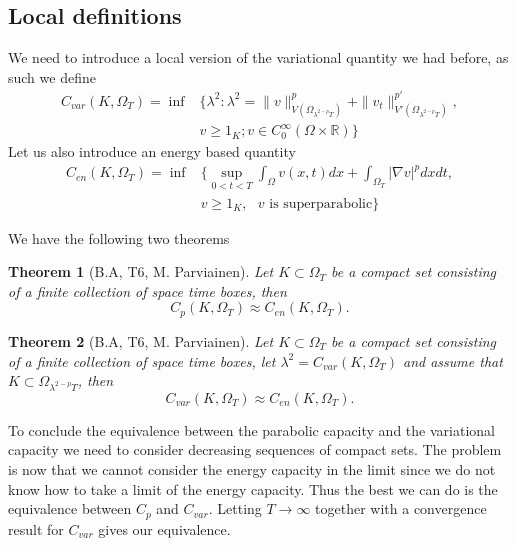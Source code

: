 \documentclass[reqno,a4paper,12pt]{amsart}
\newtheorem{theorem}{Theorem}[section]
\theoremstyle{definition}
\numberwithin{theorem}{section} \numberwithin{equation}{section}
\newcommand{\R}{{\mathbb R}}
\begin{document}
\subsection{Local definitions}
We need to introduce a local version of the variational quantity we had before, as such we define
\begin{align*} \nonumber \label{}
	C_{var}(K,\Omega_T) = \inf &\{\lambda^2: \lambda^2 = \|v\|^{p}_{V(\Omega_{\lambda^{2-p}T})} + \|v_t\|^{p'}_{V'(\Omega_{\lambda^{2-p}T})}, \\
	&v \geq 1_K; v \in C_0^\infty(\Omega \times \R) \}
\end{align*}
Let us also introduce an energy based quantity
\begin{align*} \nonumber \label{}
	C_{en}(K,\Omega_T) = \inf&\bigg\{\sup_{0 < t < T} \int_{\Omega} v(x,t)dx + \int_{\Omega_T} |\nabla v|^p dx dt, \\
	&v \geq 1_K, \text{ $v$ is superparabolic} \bigg\}
\end{align*}

We have the following two theorems
\begin{theorem}[B.A, T6, M. Parviainen] \label{equivalence1}
	Let $K \subset \Omega_T$ be a compact set consisting of a finite collection of space time boxes, then
	\begin{equation} \nonumber \label{}
		C_p(K,\Omega_T) \approx C_{en} (K,\Omega_T).
	\end{equation}
\end{theorem}
\begin{theorem}[B.A, T6, M. Parviainen] \label{equivalence2}
	Let $K \subset \Omega_T$ be a compact set consisting of a finite collection of space time boxes, let $\lambda^2 = C_{var}(K,\Omega_T)$ and assume that $K \subset \Omega_{\lambda^{2-p} T}$, then
	\begin{equation} \nonumber \label{}
		C_{var}(K,\Omega_T) \approx C_{en} (K,\Omega_T).
	\end{equation}
\end{theorem}

To conclude the equivalence between the parabolic capacity and the variational capacity we need to consider decreasing sequences of compact sets. The problem is now that we cannot consider the energy capacity in the limit since we do not know how to take a limit of the energy capacity. Thus the best we can do is the equivalence between $C_p$ and $C_{var}$. Letting $T \to \infty$ together with a convergence result for $C_{var}$ gives our equivalence.
\end{document}
